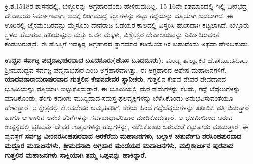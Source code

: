 ಕ್ರಿ.ಶ.1518ರ ಶಾಸನದಲ್ಲಿ, ಬೆಳ್ಳೂರನ್ನು ಅಗ್ರಹಾರವೆಂದು ಹೇಳಿರುವುದಿಲ್ಲ. 15-16ನೇ ಶತಮಾನದಲ್ಲಿ ಇಲ್ಲಿ ವೀರಭದ್ರ ದೇವಾಲಯ ನಿರ್ಮಾಣವಾಗಿ, ಅದಕ್ಕೆ ಲಿಂಗಮುದ್ರೆ ಕಲ್ಲುಗಳನ್ನು ನೆಟ್ಟು ಗದ್ದೆಯನ್ನು ದತ್ತಿಯಾಗಿ ಬಿಡಲಾಗಿದೆ. ಈ ಊರಿನಲ್ಲಿ ಜೈನಮಂದಿರವನ್ನು ಮೈಸೂರು ದೇವರಾಜ ಒಡೆಯರ ಕಾಲದಲ್ಲಿ ವಿಸ್ತರಿಸಿ ಹೊಸದಾಗಿ ಕಟ್ಟಲಾಗಿದೆ. ಬೆಳ್ಳೂರು ಸ್ಥಳದ ಹೆಬಾರುವ ಹರಿಯಪ್ಪರಸ ಮತ್ತು ಅವನ ಮಕ್ಕಳು, ವಿಶ್ವೇಶ್ವರ ದೇವಾಲಯವನ್ನು ನಿರ್ಮಿಸಿರುವಂತೆ ಕಂಡುಬರುತ್ತದೆ. ಈ ಹೊತ್ತಿಗೆ ಇದಕ್ಕಿದ್ದ ಅಗ್ರಹಾರದ ಸ್ಥಾನಮಾನ ಕಡಿಮೆಯಾಗಿರ ಬಹುದೆಂದು ಅಥವಾ ಹೇಳಬಹುದು.

\newpage

\textbf{ಉದ್ಭವ ಸರ್ವಜ್ಞ ಪದ್ಮನಾಭಪುರವಾದ ಬೂದನೂರು(ಹೊಸ ಬೂದನೂರು):} ಮಂಡ್ಯ ತಾಲ್ಲೂಕಿನ ಹೊಸಬೂದನೂರು ಶ‍್ರೀಮದುದ್ಭವ ಸರ್ವಜ್ಞ ಪದ್ಮನಾಭಪುರ ಎಂಬ ಅಗ್ರಹಾರವಾಗಿತ್ತು. ಈ ಅಗ್ರಹಾರದ ಅಶೇಷ ಮಹಾಜನಗಳಿಗೆ, \textbf{ಯಾದವನಾರಾಯಣಪುರವಾದ ಗುತ್ತಲಿನ ಕೇಶವದೇವರ ಸ್ಥಾನೀಕರು}, ಗುತ್ತಲಿನ ಕೇಶವ ದೇವರ ದೇವದಾನದ ಭೂಮಿಯನ್ನು ದತ್ತಿಯಾಗಿ ಬಿಟ್ಟುಕೊಡುತ್ತಾರೆ. ಈ ಭೂಮಿಯಲ್ಲಿ ಮರ ಕಾಡುಗಳನ್ನು ಕಡಿದು, ಗದ್ದೆ ಬೆದ್ದಲುಗಳನ್ನು ಮಾಡಿಕೊಂಡು, ತೆಂಗು ಕವುಂಗು ಮುಖ್ಯವಾದ ಸಮಸ್ತ ಫಲವೃಕ್ಷಗಳನ್ನು ಬೆಳೆಸಿಕೊಂಡು ಅನುಭವಿಸುವಂತೆಯೂ ಹೇಳುತ್ತಾರೆ. ಆ ಕ್ಷೇತ್ರದಲ್ಲಿ ಕೇಶವದೇವರ ಅಮೃತಪಡಿಗೆ, ಕೆರೆಯ ಹಿಂದೆ ಗದ್ದೆಬೆದ್ದಲುಗಳನ್ನು ಖರೀದಿಸಿ ದತ್ತಿ ಬಿಡುತ್ತಾರೆ ಹಾಗೂ ಆ ಊರಿನ ಅನೇಕ ತೆರಿಗೆಗಳನ್ನು ಸರ್ವಬಾಧಾಪರಿಹಾರ ಮಾಡಿಕೊಡುತ್ತಾರೆ. ಆ ಭೂಮಿಯಿಂದ ಬರುವ ಉತ್ಪನ್ನದಲ್ಲಿ ಪ್ರತಿವರ್ಷ ದೇವರ ಉತ್ಸವಗಳನ್ನು ಹಬ್ಬಗಳನ್ನು, ನಡೆಸಿಕೊಂಡು ಬರುವಂತೆ ಕಟ್ಟುಪಾಡು ಮಾಡುತ್ತಾರೆ. ಈ ವ್ಯವಸ್ಥೆಗೆ \textbf{ಸರ್ವಜ್ಞ ವೀರನರಸಿಂಹಪುರವಾದ ಅರಕೆರೆಯ ಮಹಾಜನಗಳು, ಬಲ್ಲಾಳ ಚತುರ್ವೇದಿ ನರಸಿಂಹಪುರವಾದ ಮದ್ದೂರ ಮಹಾಜನಗಳು, ಶ‍್ರೀಮದನಾದಿ ಅಗ್ರಹಾರ ಮಂಡೆಯದ ಮಹಾಜನಗಳು, ಮಲ್ಲಿಕಾರ್ಜುನ ಪುರವಾದ ಗುತ್ತಲಿನ ಮಹಾಜನಗಳು ಸಾಕ್ಷಿಯಾಗಿ ತಮ್ಮ ಒಪ್ಪವನ್ನು ಹಾಕಿದ್ದಾರೆ.}

